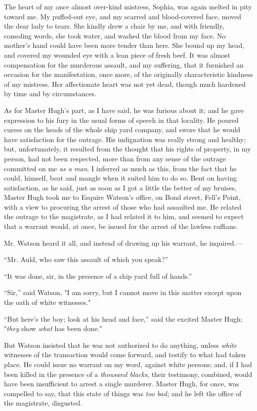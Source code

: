 The heart of my once almost over-kind mistress, Sophia, was again melted
in pity toward me. My puffed-out eye, and my scarred and blood-covered
face, moved the dear lady to tears. She kindly drew a chair by me, and
with friendly, consoling words, she took water, and washed the blood
from my face. No mother's hand could have been more tender than hers.
She bound up my head, and covered my wounded eye with a lean piece of
fresh beef. It was almost compensation for the murderous assault, and
{\protect\hypertarget{316}{}{}}my suffering, that it furnished an
occasion for the manifestation, once more, of the originally
characteristic kindness of my mistress. Her affectionate heart was not
yet dead, though much hardened by time and by circumstances.

As for Master Hugh's part, as I have said, he was furious about it; and
he gave expression to his fury in the usual forms of speech in that
locality. He poured curses on the heads of the whole ship yard company,
and swore that he would have satisfaction for the outrage. His
indignation was really strong and healthy; but, unfortunately, it
resulted from the thought that his rights of property, in my person, had
not been respected, more than from any sense of the outrage committed on
me \emph{as a man}. I inferred as much as this, from the fact that he
could, himself, beat and mangle when it suited him to do so. Bent on
having satisfaction, as he said, just as soon as I got a little the
better of my bruises, Master Hugh took me to Esquire Watson's office, on
Bond street, Fell's Point, with a view to procuring the arrest of those
who had assaulted me. He related the outrage to the magistrate, as I had
related it to him, and seemed to expect that a warrant would, at once,
be issued for the arrest of the lawless ruffians.

Mr. Watson heard it all, and instead of drawing up his warrant, he
inquired.---

``Mr. Auld, who saw this assault of which you speak?''

``It was done, sir, in the presence of a ship yard full of hands.''

``Sir,'' said Watson, "I am sorry, but I cannot move
{\protect\hypertarget{317}{}{}}in this matter except upon the oath of
white witnesses."

``But here's the boy; look at his head and face,'' said the excited
Master Hugh; "\emph{they} show \emph{what} has been done."

But Watson insisted that he was not authorized to do anything, unless
\emph{white} witnesses of the transaction would come forward, and
testify to what had taken place. He could issue no warrant on my word,
against white persons; and, if I had been killed in the presence of a
\emph{thousand blacks}, their testimony, combined, would have been
insufficient to arrest a single murderer. Master Hugh, for once, was
compelled to say, that this state of things was \emph{too bad;} and he
left the office of the magistrate, disgusted.


